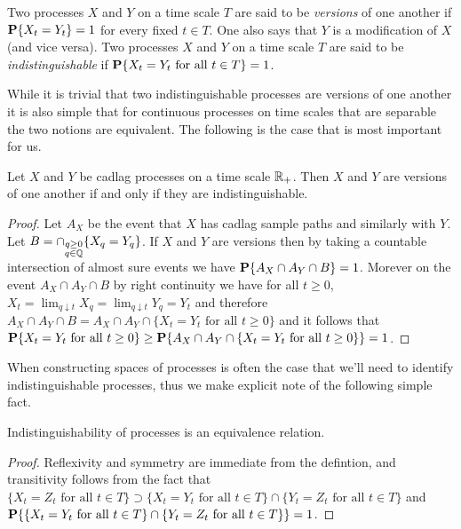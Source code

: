 \begin{defn}Two processes $X$ and $Y$ on a time scale $T$ are said to be \emph{versions} of one another if $\textbf{P}\{X_t = Y_t\} = 1$ for every fixed $t \in T$.   One also says that $Y$ is a modification of $X$ (and vice versa).  Two processes $X$ and $Y$ on a time scale $T$ are said to be \emph{indistinguishable} if $\textbf{P}\{X_t = Y_t \text{ for all } t \in T\} = 1$.
\end{defn}

While it is trivial that two indistinguishable processes are versions of one another it is also simple that for continuous processes on time scales that are separable the two notions are equivalent.  The following is the case that is most important for us.
\begin{prop}\label{VersionEquivalentIndistinguishableCadlag}Let $X$ and $Y$ be cadlag processes on a time scale $\mathbb{R}_+$.  Then $X$ and $Y$ are versions of one another if and only if they are indistinguishable.
\end{prop}
\begin{proof}
Let $A_X$ be the event that $X$ has cadlag sample paths and similarly with $Y$.  Let $B = \cap_{\substack{ q \geq 0 \\ q \in \mathbb{Q}}} \lbrace X_q = Y_q\rbrace$.  If $X$ and $Y$ are versions then by taking a countable intersection of almost sure events we have $\textbf{P}\{A_X \cap A_Y \cap B\} = 1$.  Morever on the event $A_X \cap A_Y \cap B$ by right continuity we have for all $t \geq 0$, $X_t = \lim_{q \downarrow t} X_q = \lim_{q \downarrow t} Y_q = Y_t$ and therefore $A_X \cap A_Y \cap B = A_X \cap A_Y \cap \lbrace X_t = Y_t \text { for all } t\geq 0\rbrace$ and it follows that $\textbf{P}\{X_t = Y_t \text { for all } t\geq 0\} \geq \textbf{P}\{A_X \cap A_Y \cap \lbrace X_t = Y_t \text { for all } t\geq 0\rbrace\} = 1$.
\end{proof}

When constructing spaces of processes is often the case that we'll need to identify indistinguishable processes, thus we make explicit note of the following simple fact.
\begin{prop}Indistinguishability of processes is an equivalence relation.
\end{prop}
\begin{proof}
Reflexivity and symmetry are immediate from the defintion, and transitivity follows from the fact that $\lbrace X_t = Z_t \text{ for all } t \in T \rbrace \supset \lbrace X_t = Y_t \text{ for all } t \in T \rbrace \cap \lbrace Y_t = Z_t \text{ for all } t \in T\rbrace$ and $\textbf{P}\{\lbrace X_t = Y_t \text{ for all } t \in T \rbrace \cap \lbrace Y_t = Z_t \text{ for all } t \in T\rbrace\} = 1$.
\end{proof}

